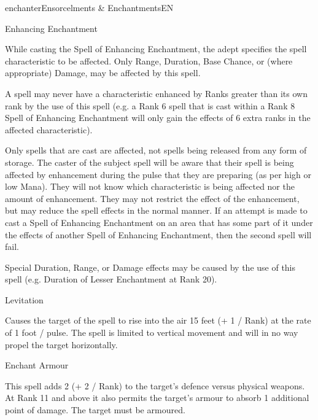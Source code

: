 \begin{College}[1.1]{enchanter}{Ensorcelments \& Enchantments}{EN}
\begin{spell}[S-7]{Enhancing Enchantment}
\begin{effects}
While casting the Spell of Enhancing Enchantment, the adept specifies
the spell characteristic to be affected.  Only Range, Duration, Base
Chance, or (where appropriate) Damage, may be affected by this spell.

A spell may never have a characteristic enhanced by Ranks greater than
its own rank by the use of this spell (e.g. a Rank 6 spell that is
cast within a Rank 8 Spell of Enhancing Enchantment will only gain the
effects of 6 extra ranks in the affected characteristic).

Only spells that are cast are affected, not spells being released from
any form of storage.  The caster of the subject spell will be aware
that their spell is being affected by enhancement during the pulse
that they are preparing (as per high or low Mana). They will not know
which characteristic is being affected nor the amount of enhancement.
They may not restrict the effect of the enhancement, but may reduce
the spell effects in the normal manner. If an attempt is made to
cast a Spell of Enhancing Enchantment on an area that has some part of
it under the effects of another Spell of Enhancing Enchantment, then
the second spell will fail.

Special Duration, Range, or Damage effects may be caused by the use of
this spell (e.g. Duration of Lesser Enchantment at Rank 20).
\end{effects}
\end{spell}

\begin{spell}[S-8]{Levitation}

\begin{effects}
Causes the target of the spell to rise into the air 15 feet (+ 1 /
Rank) at the rate of 1 foot / pulse.  The spell is limited to vertical
movement and will in no way propel the target horizontally.
\end{effects}
\end{spell}

\begin{spell}[S-9]{Enchant Armour}

\begin{effects}
This spell adds 2 (+ 2 / Rank) to the target’s defence versus physical
weapons.  At Rank 11 and above it also permits the target’s armour to
absorb 1 additional point of damage.  The target must be armoured.
\end{effects}
\end{spell}


\end{College}
